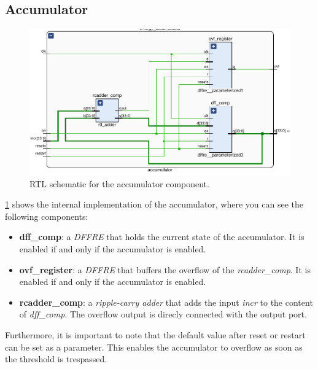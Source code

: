 \subsection{Accumulator}
\begin{figure}[]
  \centering
  \includegraphics[width=\textwidth]{figs/accumulator_schematic.pdf}
  \caption{RTL schematic for the accumulator component.}
  \label{fig:accumulator}
\end{figure}

\cref{fig:accumulator} shows the internal implementation of the accumulator, where you
can see the following components:
\begin{itemize}
  \item \textbf{dff\_comp}: a \emph{DFFRE} that holds the current state of the
    accumulator. It is enabled if and only if the accumulator is enabled.
  \item \textbf{ovf\_register}: a \emph{DFFRE} that buffers the overflow of the
    \emph{rcadder\_comp}. It is enabled if and only if the accumulator is enabled.
  \item \textbf{rcadder\_comp}: a \emph{ripple-carry adder} that adds the input
    \emph{incr} to the content of \emph{dff\_comp}. The overflow output is
    direcly connected with the output port.
\end{itemize}

Furthermore, it is important to note that the default value after reset
or restart can be set as a parameter.
This enables the accumulator to overflow as soon as the threshold is trespassed.

